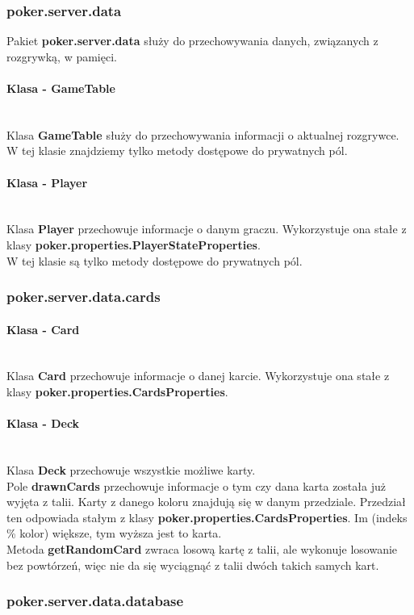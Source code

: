 \documentclass{article}
\newcommand{\mparagraph}[1]{\paragraph{#1}\mbox{}\vspace{2mm}\\}
\begin{document}
                
        \subsubsection{poker.server.data}
            Pakiet \textbf{poker.server.data} służy do przechowywania danych, związanych z rozgrywką, w pamięci.
        
            \mparagraph{Klasa - GameTable}
                Klasa \textbf{GameTable} służy do przechowywania informacji o aktualnej rozgrywce.
                \\
                W tej klasie znajdziemy tylko metody dostępowe do prywatnych pól.
                
            \mparagraph{Klasa - Player}
                Klasa \textbf{Player} przechowuje informacje o danym graczu.
                Wykorzystuje ona stałe z klasy \textbf{poker.properties.PlayerStateProperties}.
                \\
                W tej klasie są tylko metody dostępowe do prywatnych pól.
        
        \subsubsection{poker.server.data.cards}
        
            \mparagraph{Klasa - Card}
                Klasa \textbf{Card} przechowuje informacje o danej karcie.
                Wykorzystuje ona stałe z klasy \textbf{poker.properties.CardsProperties}.
        
            \mparagraph{Klasa - Deck}
                Klasa \textbf{Deck} przechowuje wszystkie możliwe karty.
                \\
                Pole \textbf{drawnCards} przechowuje informacje o tym czy dana karta została już wyjęta z talii.
                Karty z danego koloru znajdują się w danym przedziale. Przedział ten odpowiada stałym z klasy \textbf{poker.properties.CardsProperties}. Im (indeks \% kolor) większe, tym wyższa jest to karta.
                \\
                Metoda \textbf{getRandomCard} zwraca losową kartę z talii, ale wykonuje losowanie bez powtórzeń, więc nie da się wyciągnąć z talii dwóch takich samych kart.
            
        
        \subsubsection{poker.server.data.database}
        
\end{document}
